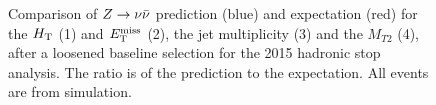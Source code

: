 \begin{figure}[h]
{}
\caption{Comparison of $Z\rightarrow \nu\bar{\nu}$ prediction (blue) and expectation (red) for the $H_{\rm T}$ (1) and $E_{\text{T}}^{\rm miss}$ (2), the jet multiplicity (3) and the $M_{T2}$ (4), after a loosened baseline selection for the 2015 hadronic stop analysis. The ratio is of the prediction to the expectation. All events are from simulation.}
\label{fig:ZInvCR_MetHtNjMt2}
\end{figure}


